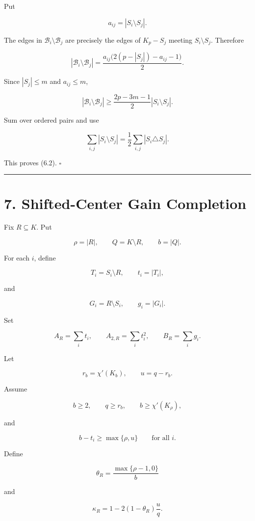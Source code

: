 \documentclass[
  11pt,
]{article}
\begin{document}
Put

\[
a_{ij}=|S_i\setminus S_j|.
\]

The edges in \(\mathcal B_i\setminus\mathcal B_j\) are precisely the
edges of \(K_p-S_j\) meeting \(S_i\setminus S_j\). Therefore

\[
|\mathcal B_i\setminus\mathcal B_j|
=
\frac{a_{ij}\bigl(2(p-|S_j|)-a_{ij}-1\bigr)}2.
\]

Since \(|S_j|\le m\) and \(a_{ij}\le m\),

\[
|\mathcal B_i\setminus\mathcal B_j|
\ge
\frac{2p-3m-1}{2}|S_i\setminus S_j|.
\]

Sum over ordered pairs and use

\[
\sum_{i,j}|S_i\setminus S_j|
=
\frac12\sum_{i,j}|S_i\triangle S_j|.
\]

This proves (6.2). \(\square\)

\begin{center}\rule{0.5\linewidth}{0.5pt}\end{center}

\section{7. Shifted-Center Gain
Completion}\label{shifted-center-gain-completion}

Fix \(R\subseteq K\). Put

\[
\rho=|R|,
\qquad
Q=K\setminus R,
\qquad
b=|Q|.
\]

For each \(i\), define

\[
T_i=S_i\setminus R,
\qquad
t_i=|T_i|,
\]

and

\[
G_i=R\setminus S_i,
\qquad
g_i=|G_i|.
\]

Set

\[
A_R=\sum_i t_i,
\qquad
A_{2,R}=\sum_i t_i^2,
\qquad
B_R=\sum_i g_i.
\]

Let

\[
r_b=\chi'(K_b),
\qquad
u=q-r_b.
\]

Assume

\[
b\ge2,
\qquad
q\ge r_b,
\qquad
b\ge\chi'(K_\rho),
\tag{7.1}
\]

and

\[
b-t_i\ge\max\{\rho,u\}
\qquad
\text{for all }i.
\tag{7.2}
\]

Define

\[
\theta_R=\frac{\max\{\rho-1,0\}}{b}
\]

and

\[
\kappa_R
=
1-2(1-\theta_R)\frac{u}{q}.
\tag{7.3}
\]
\end{document}
